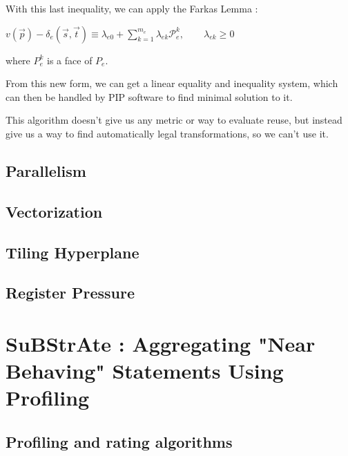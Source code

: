 \documentclass[paper=a4, fontsize=11pt]{scrartcl}
\numberwithin{equation}{section}        %
\numberwithin{figure}{section}          %
\numberwithin{table}{section}               %
\begin{document}
            With this last inequality, we can apply the Farkas Lemma :
            \begin{center}
                $v(\vec{p}) - \delta_e\left(\vec{s},\vec{t}\right) \equiv \lambda_{e0}
                + \sum\limits_{k=1}^{m_e}{\lambda_{ek}\mathcal{P}_{e}^k},\qquad \lambda_{ek} \geq 0$
            \end{center}
            where $P_e^k$ is a face of $P_e$.

            From this new form, we can get a linear equality and inequality system,
            which can then be handled by PIP software to find minimal solution to it.

            This algorithm doesn't give us any metric or way to evaluate reuse, but instead
            give us a way to find automatically legal transformations, so we can't use it.


    \subsection{Parallelism}
        \subsubsection{}
    \subsection{Vectorization}
    \subsection{Tiling Hyperplane}
    \subsection{Register Pressure}

\section{SuBStrAte : Aggregating "Near Behaving" Statements Using Profiling}
    \subsection{Profiling and rating algorithms}
\end{document}
